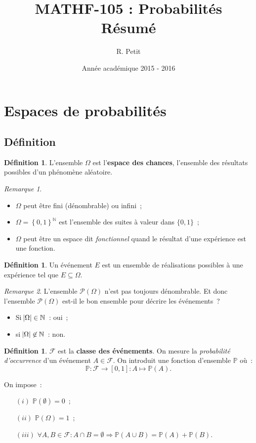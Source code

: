 \documentclass{article}
\author{R. Petit}
\title{MATHF-105 : Probabilités \\ Résumé}
\date{Année académique 2015 - 2016}
\newcommand{\N}{\mathbb N}
\renewcommand{\P}{\mathbb P}
\theoremstyle{definition}
\newtheorem{déf}[thm]{Définition}
\theoremstyle{remark}
\newtheorem*{rmq}{Remarque}
\begin{document}
\maketitle
\tableofcontents
\newpage
{}

\section{Espaces de probabilités}
	\subsection{Définition}
		\begin{déf} L'ensemble $\Omega$ est l'\textbf{espace des chances}, l'ensemble des résultats possibles d'un phénomène aléatoire. \end{déf}

		\begin{rmq}~
		\begin{itemize}
			\item $\Omega$ peut être fini (dénombrable) ou infini~;
			\item $\Omega = \left\{0, 1\right\}^\N$ est l'ensemble des suites à valeur dans $\{0, 1\}$~;
			\item $\Omega$ peut être un espace dit \textit{fonctionnel} quand le résultat d'une expérience est une fonction.
		\end{itemize}
		\end{rmq}

		\begin{déf} Un événement $E$ est un ensemble de réalisations possibles à une expérience tel que $E \subseteq \Omega$. \end{déf}

		\begin{rmq} L'ensemble $\mathcal P(\Omega)$ n'est pas toujours dénombrable. Et donc l'ensemble $\mathcal P(\Omega)$ est-il le bon ensemble pour décrire
		les événements~?
		
		\begin{itemize}
			\item Si $\abs \Omega \in \N$~: oui~;
			\item si $\abs \Omega \not \in \N$~: non.
		\end{itemize}
		\end{rmq}

		\begin{déf} $\mathcal F$ est la \textbf{classe des événements}. On mesure la \textit{probabilité d'occurrence} d'un événement $A \in \mathcal F$.
		On introduit une fonction d'ensemble $\P$ où~:
		\[\P : \mathcal F \to [0, 1] : A \mapsto \P(A).\]

		On impose~:
		\begin{itemize}
			\item[$(i)$] $\P(\emptyset) = 0$~;
			\item[$(ii)$] $\P(\Omega) = 1$~;
			\item[$(iii)$] $\forall A, B \in \mathcal F : A \cap B = \emptyset \Rightarrow \P(A \cup B) = \P(A) + \P(B)$.
		\end{itemize}
		\end{déf}
\end{document}
